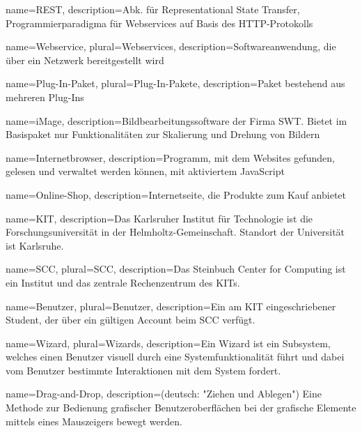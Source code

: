 %
%
%
%
{
	name=REST,
	description={Abk. für Representational State Transfer, Programmierparadigma für \glspl{Webservice} auf Basis des HTTP-Protokolls}
}

{
	name=Webservice,
	plural=Webservices,
	description={Softwareanwendung, die über ein Netzwerk bereitgestellt wird}
}

{
	name=Plug-In-Paket,
	plural=Plug-In-Pakete,
	description={Paket bestehend aus mehreren \glspl{Plug-In}}
}

{
	name={iMage},
	description={Bildbearbeitungssoftware der Firma SWT. Bietet im Basispaket nur Funktionalitäten zur Skalierung und Drehung von Bildern}
}

{
	name={Internetbrowser},
	description={Programm, mit dem Websites gefunden, gelesen und verwaltet werden können, mit aktiviertem JavaScript}
}

{
	name={Online-Shop},
	description={Internetseite, die Produkte zum Kauf anbietet}
}

{
	name=KIT,
	description={Das Karlsruher Institut für Technologie ist die Forschungsuniversität in der Helmholtz-Gemeinschaft. Standort der Universität ist Karlsruhe. }
}

{
	name=SCC,
	plural=SCC,
	description={Das Steinbuch Center for Computing ist ein Institut und das zentrale Rechenzentrum des \gls{KIT}s.}
}

{
	name=Benutzer,
	plural=Benutzer,
	description={Ein am \gls{KIT} eingeschriebener Student, der über ein gültigen Account beim \gls{SCC} verfügt.}
}

{
	name=Wizard,
	plural=Wizards,
	description={Ein Wizard ist ein Subsystem, welches einen \gls{Benutzer} visuell durch eine Systemfunktionalität führt und dabei vom \gls{Benutzer} bestimmte Interaktionen mit dem System fordert.}
}

{
	name=Drag-and-Drop,
	description={(deutsch: "Ziehen und Ablegen") Eine Methode zur Bedienung grafischer Benutzeroberflächen bei der grafische Elemente mittels eines Mauszeigers bewegt werden.}
}

